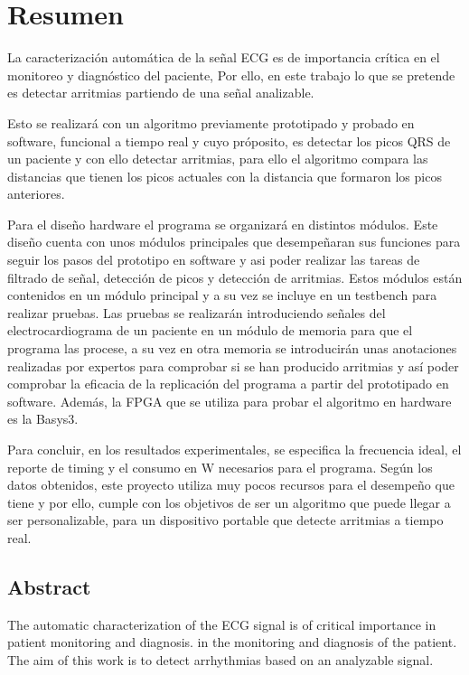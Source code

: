 \chapter{Resumen}

	La caracterización automática de la señal ECG es de importancia crítica 
	en el monitoreo y diagnóstico del paciente, Por ello, en este trabajo 
	lo que se pretende es detectar arritmias partiendo de una señal analizable.
    
    Esto se realizará con un algoritmo previamente prototipado y probado en software, funcional a tiempo real y cuyo próposito, es detectar
    los picos QRS de un paciente y con ello detectar arritmias, para ello el algoritmo compara las distancias que tienen los picos actuales con la distancia que formaron los picos anteriores.
    
    Para el diseño hardware el programa se organizará en distintos módulos. Este diseño cuenta con unos módulos principales que desempeñaran sus funciones para 
    seguir los pasos del prototipo en software y asi poder realizar las tareas de filtrado de señal, detección de picos y detección de arritmias.
    Estos módulos están contenidos en un módulo principal y a su vez se incluye en un testbench para realizar pruebas. Las pruebas se 
    realizarán introduciendo señales del electrocardiograma de un paciente en un módulo de memoria para que el programa las procese, a su vez en otra memoria se introducirán unas anotaciones 
    realizadas por expertos para comprobar si se han producido arritmias y así poder comprobar la eficacia de la replicación del programa a partir del prototipado en software.  Además, la FPGA 
    que se utiliza para probar el algoritmo en hardware es la Basys3.
    
    Para concluir, en los resultados experimentales, se especifica la frecuencia ideal, el reporte de timing y el 
    consumo en W necesarios para el programa. Según los datos obtenidos, este proyecto utiliza muy pocos recursos para el desempeño que tiene 
    y por ello, cumple con los objetivos de ser un algoritmo que puede llegar a ser personalizable, para un dispositivo portable que detecte arritmias a tiempo real.

\section{Abstract}

The automatic characterization of the ECG signal is of critical importance in patient monitoring and diagnosis. 
	in the monitoring and diagnosis of the patient. 
	The aim of this work is to detect arrhythmias based on an analyzable signal.
    
